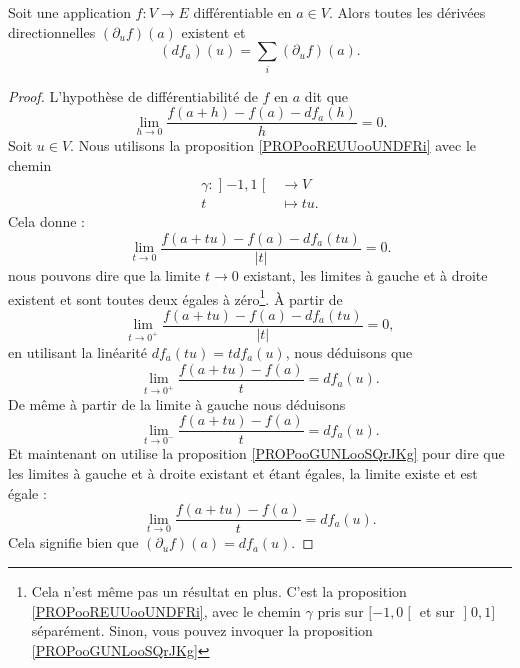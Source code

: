\begin{proposition}			\label{PROPooZOFLooBmcZqN}
	Soit une application \(f \colon V\to E  \) différentiable en \( a\in V\). Alors toutes les dérivées directionnelles \( (\partial_uf)(a)\) existent et
	\begin{equation}
		(df_a)(u)=\sum_i(\partial_uf)(a).
	\end{equation}
\end{proposition}

\begin{proof}
	L'hypothèse de différentiabilité de \( f\) en \( a\) dit que
	\begin{equation}
		\lim_{h\to 0} \frac{ f(a+h)-f(a)-df_a(h) }{ h }=0.
	\end{equation}
	Soit \( u\in V\). Nous utilisons la proposition \ref{PROPooREUUooUNDFRi} avec le chemin
	\begin{equation}
		\begin{aligned}
			\gamma\colon \mathopen] -1,1\mathclose[ & \to V       \\
			t                                       & \mapsto tu.
		\end{aligned}
	\end{equation}
	Cela donne :
	\begin{equation}
		\lim_{t\to 0}\frac{ f(a+tu)-f(a)-df_a(tu) }{ | t | }=0.
	\end{equation}
	nous pouvons dire que la limite \( t\to 0\) existant, les limites à gauche et à droite existent et sont toutes deux égales à zéro\footnote{Cela n'est même pas un résultat en plus. C'est la proposition \ref{PROPooREUUooUNDFRi}, avec le chemin $ \gamma $ pris sur $ \mathopen[ -1,0\mathclose[$ et sur $ \mathopen] 0,1\mathclose]$ séparément. Sinon, vous pouvez invoquer la proposition \ref{PROPooGUNLooSQrJKg}}. À partir de
	\begin{equation}
		\lim_{t\to 0^+}\frac{ f(a+tu)-f(a)-df_a(tu) }{ | t | }=0,
	\end{equation}
	en utilisant la linéarité \( df_a(tu)=tdf_a(u)\), nous déduisons que
	\begin{equation}
		\lim_{t\to 0^+}\frac{ f(a+tu)-f(a) }{t}=df_a(u).
	\end{equation}
	De même à partir de la limite à gauche nous déduisons
	\begin{equation}
		\lim_{t\to 0^-}\frac{ f(a+tu)-f(a) }{t}=df_a(u).
	\end{equation}
	Et maintenant on utilise la proposition \ref{PROPooGUNLooSQrJKg} pour dire que les limites à gauche et à droite existant et étant égales, la limite existe et est égale :
	\begin{equation}
		\lim_{t\to 0}\frac{ f(a+tu)-f(a) }{t}=df_a(u).
	\end{equation}
	Cela signifie bien que \( (\partial_uf)(a)=df_a(u)\).
\end{proof}

